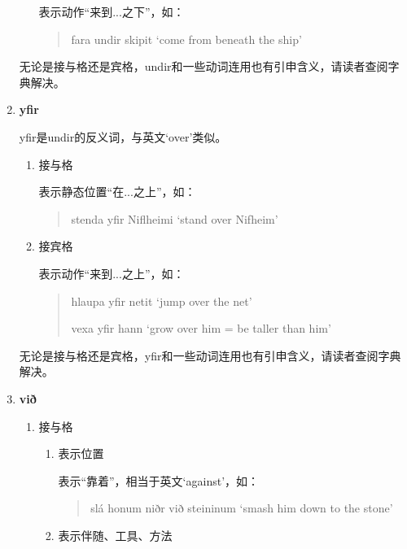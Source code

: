 \begin{enumerate}[itemindent=1em, label=\textbf{\arabic*}.]
\begin{enumerate}
                    表示动作“来到...之下”，如：
                    \begin{quote}
                        fara undir skipit `come from beneath the ship'
                    \end{quote}
          \end{enumerate}
          无论是接与格还是宾格，undir和一些动词连用也有引申含义，请读者查阅字典解决。

    \item \textbf{yfir}

          yfir是undir的反义词，与英文`over'类似。
          \begin{enumerate}
              \item 接与格

                    表示静态位置“在...之上”，如：
                    \begin{quote}
                        stenda yfir Niflheimi `stand over Nifheim'
                    \end{quote}
              \item 接宾格

                    表示动作“来到...之上”，如：
                    \begin{quote}
                        hlaupa yfir netit `jump over the net'

                        vexa yfir hann `grow over him = be taller than him'
                    \end{quote}
          \end{enumerate}
          无论是接与格还是宾格，yfir和一些动词连用也有引申含义，请读者查阅字典解决。

    \item \textbf{við}
          \begin{enumerate}
              \item 接与格
                    \begin{enumerate}
                        \item 表示位置

                              表示“靠着”，相当于英文`against'，如：
                              \begin{quote}
                                  slá honum niðr við steininum `smash him down to the stone'
                              \end{quote}

                        \item 表示伴随、工具、方法


\end{enumerate}
\end{enumerate}
\end{enumerate}
